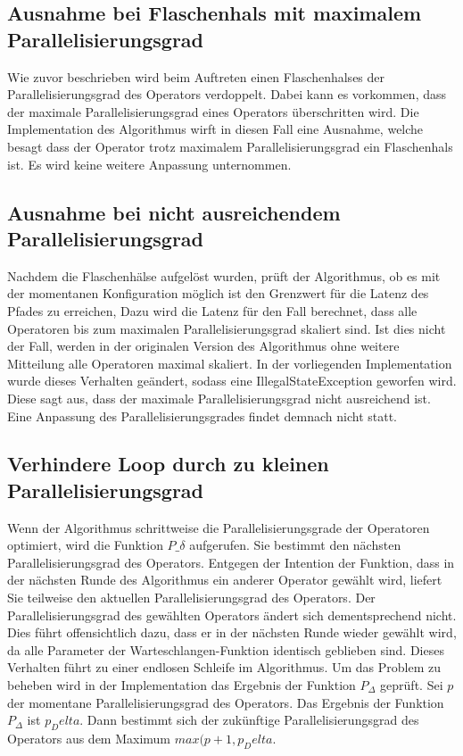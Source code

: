 \subsection{Ausnahme bei Flaschenhals mit maximalem Parallelisierungsgrad}
Wie zuvor beschrieben wird beim Auftreten einen Flaschenhalses der Parallelisierungsgrad des Operators verdoppelt. 
Dabei kann es vorkommen, dass der maximale Parallelisierungsgrad eines Operators überschritten wird. 
Die Implementation des Algorithmus wirft in diesen Fall eine Ausnahme, welche besagt dass der Operator trotz maximalem Parallelisierungsgrad ein Flaschenhals ist.
Es wird keine weitere Anpassung unternommen.

\subsection{Ausnahme bei nicht ausreichendem Parallelisierungsgrad}
Nachdem die Flaschenhälse aufgelöst wurden, prüft der Algorithmus, ob es mit der momentanen Konfiguration möglich ist den Grenzwert für die Latenz des Pfades zu erreichen,
Dazu wird die Latenz für den Fall berechnet, dass alle Operatoren bis zum maximalen Parallelisierungsgrad skaliert sind. Ist dies nicht der Fall, werden in der originalen Version des Algorithmus ohne weitere Mitteilung alle Operatoren maximal skaliert. In der vorliegenden Implementation wurde dieses Verhalten geändert, sodass eine IllegalStateException geworfen wird. Diese sagt aus, dass der maximale Parallelisierungsgrad nicht ausreichend ist. Eine Anpassung des Parallelisierungsgrades findet demnach nicht statt.

\subsection{Verhindere Loop durch zu kleinen Parallelisierungsgrad}
Wenn der Algorithmus schrittweise die Parallelisierungsgrade der Operatoren optimiert, wird die Funktion \(P\_\delta\) aufgerufen.
Sie bestimmt den nächsten Parallelisierungsgrad des Operators.
Entgegen der Intention der Funktion, dass in der nächsten Runde des Algorithmus ein anderer Operator gewählt wird, liefert Sie teilweise den aktuellen Parallelisierungsgrad des Operators.
Der Parallelisierungsgrad des gewählten Operators ändert sich dementsprechend nicht.
Dies führt offensichtlich dazu, dass er in der nächsten Runde wieder gewählt wird, da alle Parameter der Warteschlangen-Funktion identisch geblieben sind.
Dieses Verhalten führt zu einer endlosen Schleife im Algorithmus.
Um das Problem zu beheben wird in der Implementation das Ergebnis der Funktion \(P_\Delta\) geprüft.
Sei \(p\) der momentane Parallelisierungsgrad des Operators.
Das Ergebnis der Funktion \(P_\Delta\) ist \(p_Delta\).
Dann bestimmt sich der zukünftige Parallelisierungsgrad des Operators aus dem Maximum \(max(p+1, p_Delta\).

